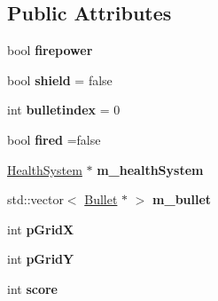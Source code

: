 \subsection*{Public Attributes}
\begin{DoxyCompactItemize}
\item 
\mbox{\label{class_player_a99a734c14d6e6944aeb2ccfead048cec}} 
bool {\bfseries firepower}
\item 
\mbox{\label{class_player_a9344b3d4b21620e95eea29fca8d420bc}} 
bool {\bfseries shield} = false
\item 
\mbox{\label{class_player_a2a5b1dd4fa4e0f9e5310a457d4b51d3e}} 
int {\bfseries bulletindex} = 0
\item 
\mbox{\label{class_player_ae5511e5935bb5ab6d6c7cb8b483a0783}} 
bool {\bfseries fired} =false
\item 
\mbox{\label{class_player_a00c55ba2903f0068f3fee237c89c8363}} 
\mbox{\hyperlink{class_health_system}{Health\+System}} $\ast$ {\bfseries m\+\_\+health\+System}
\item 
\mbox{\label{class_player_a450660f5985e1a52cb2e2f17d02c9932}} 
std\+::vector$<$ \mbox{\hyperlink{class_bullet}{Bullet}} $\ast$ $>$ {\bfseries m\+\_\+bullet}
\item 
\mbox{\label{class_player_a4f011b312116eceaa5bd62b7c309a9bd}} 
int {\bfseries p\+GridX}
\item 
\mbox{\label{class_player_ad4e99d34e5e0d700f4787d50dc45f3e7}} 
int {\bfseries p\+GridY}
\item 
\mbox{\label{class_player_ace6abae8d66534ad0a1fd6458f786a6e}} 
int {\bfseries score}
\end{DoxyCompactItemize}
